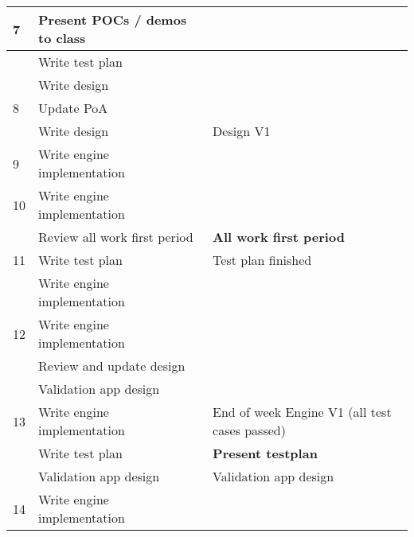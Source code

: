 \documentclass{article}
\begin{document}
\begin{longtable}{|l|p{}|p{}|}
    7                    & Present POCs / demos to class             &                                         \\ \hline
                         & Write test plan                           &                                         \\ \hline
                         & Write design                              &                                         \\ \hline
    8                    & Update PoA                                &                                         \\ \hline
                         & Write design                              & Design V1                               \\ \hline
    9                    & Write engine implementation               &                                         \\ \hline
    10                   & Write engine implementation               &                                         \\ \hline
                         & Review all work first period              & \textbf{All work first period}          \\ \hline
    11                   & Write test plan                           & Test plan finished                      \\ \hline
                         & Write engine implementation               &                                         \\ \hline
    12                   & Write engine implementation               &                                         \\ \hline
                         & Review and update design                  &                                         \\ \hline
                         & Validation app design                     &                                         \\ \hline
    13                   & Write engine implementation               & End of week Engine V1 (all test cases passed)       \\ \hline
                         & Write test plan                           & \textbf{Present testplan}               \\ \hline
                         & Validation app design                     & Validation app design                   \\ \hline
    14                   & Write engine implementation               &                                         \\ \hline

\end{longtable}
\end{document}
